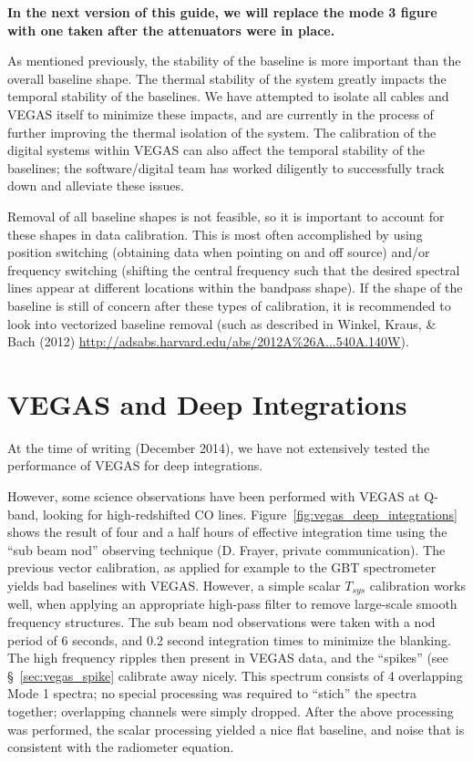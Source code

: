 {\bf In the next version of this guide, we will replace the mode 3 figure 
with one taken after the attenuators were in place.}

As mentioned previously, the stability of the baseline is more important 
than the overall baseline shape. The thermal stability 
of the system greatly impacts the temporal stability of the baselines. 
We have attempted to isolate all cables and VEGAS itself to minimize 
these impacts, and are currently in the process of further improving the 
thermal isolation of the system. The calibration of the digital systems 
within VEGAS can also affect the temporal stability of the baselines; 
the software/digital team has worked diligently to successfully track down 
and alleviate these issues.

Removal of all baseline shapes is not feasible, so it is important to 
account for these shapes in data calibration. This is most often 
accomplished by using position switching (obtaining data when pointing on 
and off source) and/or frequency switching (shifting the central frequency 
such that the desired spectral lines appear at different locations 
within the bandpass shape). If the shape of the baseline is still of concern 
after these types of calibration, it is recommended to look into 
vectorized baseline removal (such as described in  Winkel, Kraus, 
\& Bach (2012) \url{http://adsabs.harvard.edu/abs/2012A%26A...540A.140W}).

\section{VEGAS and Deep Integrations}\label{sec:vegas_deep_integrations}

At the time of writing (December 2014), we have not extensively tested the
performance of VEGAS for deep integrations.

However, some science observations have been performed with VEGAS at Q-band,
looking for high-redshifted CO lines. Figure~\ref{fig:vegas_deep_integrations}
shows the result of four and a half hours of effective integration time
using the ``sub beam nod'' observing technique (D. Frayer, private
communication). The previous vector calibration, as applied for example to
the GBT spectrometer yields bad baselines with VEGAS. However, a simple
scalar $T_{sys}$ calibration works well, when applying an appropriate high-pass
filter to remove large-scale smooth frequency structures. The sub beam nod
observations were taken with a nod period of 6 seconds, and 0.2 second 
integration times to minimize the blanking. The high frequency ripples then
present in VEGAS data, and the ``spikes'' (see \S~\ref{sec:vegas_spike}
calibrate away nicely. This spectrum consists of 4 overlapping Mode 1 
spectra; no special processing was required to ``stich'' the spectra
together; overlapping channels were simply dropped. After the above processing
was performed, the scalar processing yielded a nice flat baseline, and
noise that is consistent with the radiometer equation.

